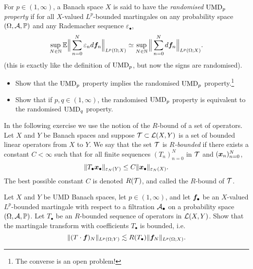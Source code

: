 \begin{exercise}
  For $p \in (1,\infty)$, a Banach space $X$ is said to have the \emph{randomised $\mathrm{UMD}_{p}$ property} if for all $X$-valued $L^p$-bounded martingales on any probability space $(\Omega,\mathcal{A},\mathbb{P})$ and any Rademacher sequence $\varepsilon_{\bullet}$,
  \begin{equation*}
    \sup_{N \in \mathbb{N}} \mathbb{E} \Big\| \sum_{n=0}^{N} \varepsilon_{n} d\bm{f}_{n} \Big\|_{L^p(\Omega;X)} \simeq \sup_{N \in \mathbb{N}} \Big\| \sum_{n=0}^{N} d\bm{f}_{n} \Big\|_{L^p(\Omega;X)}.
  \end{equation*}
  (this is exactly like the definition of $\mathrm{UMD}_{p}$, but now the signs are randomised).

  \begin{itemize}
  \item Show that the $\mathrm{UMD}_{p}$ property implies the randomised $\mathrm{UMD}_{p}$ property.\footnote{The converse is an open problem!}
  \item Show that if $p,q \in (1,\infty)$, the randomised $\mathrm{UMD}_{p}$ property is equivalent to the randomised $\mathrm{UMD}_{q}$ property.
  \end{itemize}

\end{exercise}

In the following exercise we use the notion of the $R$-bound of a set of operators.
Let $X$ and $Y$ be Banach spaces and suppose $\mathcal{T} \subset \mathcal{L}(X,Y)$ is a set of bounded linear operators from $X$ to $Y$.
We say that the set $\mathcal{T}$ is \emph{$R$-bounded} if there exists a constant $C < \infty$ such that for all finite sequences $(T_{n})_{n=0}^{N}$ in $\mathcal{T}$ and $(\bm{x}_{n})_{n=0}^{N}$,
\begin{equation*}
  \|T_{\bullet} \bm{x}_{\bullet}\|_{\varepsilon_{N}(Y)} \leq C \|\bm{x}_{\bullet}\|_{\varepsilon_{N}(X)}.
\end{equation*}
The best possible constant $C$ is denoted $R(\mathcal{T})$, and called the $R$-bound of $\mathcal{T}$.

\begin{exercise}\label{ex:R-bd-mgale-tf}
  Let $X$ and $Y$ be UMD Banach spaces, let $p \in (1,\infty)$, and let $\bm{f}_{\bullet}$ be an $X$-valued $L^p$-bounded martingale with respect to a filtration $\mathcal{A}_{\bullet}$ on a probability space $(\Omega,\mathcal{A},\mathbb{P})$.
  Let $T_{\bullet}$ be an $R$-bounded sequence of operators in $\mathcal{L}(X,Y)$.
  Show that the martingale transform with coefficients $T_{\bullet}$ is bounded, i.e.
  \begin{equation*}
    \| (T \cdot \bm{f})_{N} \|_{L^p(\Omega;Y)} \lesssim R(T_{\bullet}) \|\bm{f}_{N}\|_{L^p(\Omega;X)}.
  \end{equation*}
\end{exercise}





